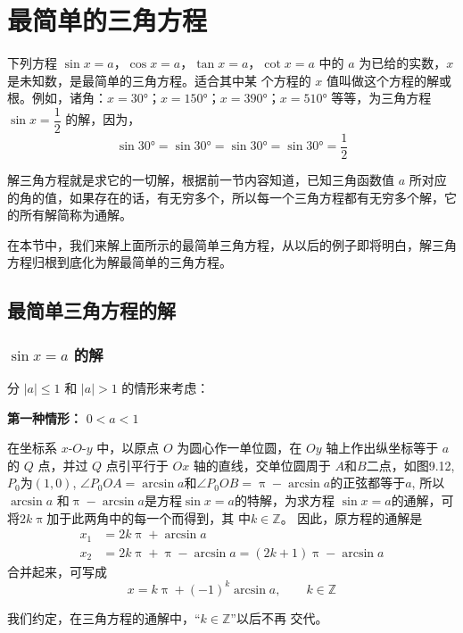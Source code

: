 \section{最简单的三角方程}
下列方程 $\sin x=a$，$\cos x=a$，$\tan x=a$，$\cot x=a$ 中的 $a$ 为已给的实数，$x$ 是未知数，是最简单的三角方程。适合其中某
个方程的 $x$ 值叫做这个方程的解或根。例如，诸角：$x=\ang{30}$；$x=\ang{150}$；$x=\ang{390}$；$x=\ang{510}$ 等等，为三角方程
$\sin x=\dfrac{1}{2}$ 的解，因为，
\[\sin\ang{30}=\sin\ang{30}=\sin\ang{30}=\sin\ang{30}=\frac{1}{2}\]

解三角方程就是求它的一切解，根据前一节内容知道，已知三角函数值 $a$ 所对应的角的值，如果存在的话，有无穷多个，所以每一个三角方程都有无穷多个解，它的所有解简称为通解。

在本节中，我们来解上面所示的最简单三角方程，从以后的例子即将明白，解三角方程归根到底化为解最简单的三角方程。

\subsection{最简单三角方程的解}
\subsubsection{$\sin x=a$ 的解}
分 $|a|\leqslant 1$ 和 $|a|>1$ 的情形来考虑：

\textbf{第一种情形：} $0<a<1$
 
在坐标系 $x$-$O$-$y$ 中，以原点 $O$ 为圆心作一单位圆，在 $Oy$ 轴上作出纵坐标等于 $a$ 的 $Q$ 点，并过 $Q$ 点引平行于 $Ox$ 轴的直线，交单位圆周于 $A$和$B$二点，如图9.12, $P_0$为$(1,0)$,
$\angle P_0OA=\arcsin a$和$\angle P_0OB=\uppi-\arcsin a$的正弦都等于$a$,
所以$\arcsin a$ 和$\uppi-\arcsin a$是方程$\sin x=a$的特解，为求方程
$\sin x=a$的通解，可将$2k\uppi$加于此两角中的每一个而得到，其
中$k\in\mathbb{Z}$。 因此，原方程的通解是
\[\begin{split}
   x_1&=2k\uppi +\arcsin a\\
x_2&=2k\uppi +\uppi -\arcsin a=(2k+1)\uppi -\arcsin a 
\end{split}\]
合并起来，可写成
\[x=k\uppi +(-1)^k\arcsin a,\qquad k\in\mathbb{Z}\]

我们约定，在三角方程的通解中，“$k\in\mathbb{Z}$”以后不再
交代。

